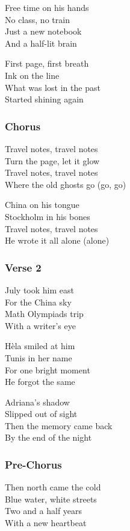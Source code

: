 \documentclass[]{article}
\begin{document}
Free time on his hands\\
No class, no train\\
Just a new notebook\\
And a half-lit brain

First page, first breath\\
Ink on the line\\
What was lost in the past\\
Started shining again

\subsubsection{Chorus}\label{chorus-52}

Travel notes, travel notes\\
Turn the page, let it glow\\
Travel notes, travel notes\\
Where the old ghosts go (go, go)

China on his tongue\\
Stockholm in his bones\\
Travel notes, travel notes\\
He wrote it all alone (alone)

\subsubsection{Verse 2}\label{verse-2-17}

July took him east\\
For the China sky\\
Math Olympiads trip\\
With a writer's eye

Hèla smiled at him\\
Tunis in her name\\
For one bright moment\\
He forgot the same

Adriana's shadow\\
Slipped out of sight\\
Then the memory came back\\
By the end of the night

\subsubsection{Pre-Chorus}\label{pre-chorus-35}

Then north came the cold\\
Blue water, white streets\\
Two and a half years\\
With a new heartbeat
\end{document}
